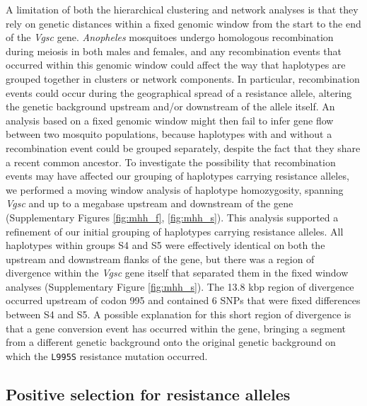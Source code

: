 \documentclass[a4paper,11pt,abstracton,hidelinks]{scrartcl}
\begin{document}
%
A limitation of both the hierarchical clustering and network analyses is that they rely on genetic distances within a fixed genomic window from the start to the end of the \textit{Vgsc} gene.
%
\textit{Anopheles} mosquitoes undergo homologous recombination during meiosis in both males and females, and any recombination events that occurred within this genomic window could affect the way that haplotypes are grouped together in clusters or network components.
%
In particular, recombination events could occur during the geographical spread of a resistance allele, altering the genetic background upstream and/or downstream of the allele itself.
%
An analysis based on a fixed genomic window might then fail to infer gene flow between two mosquito populations, because haplotypes with and without a recombination event could be grouped separately, despite the fact that they share a recent common ancestor.
%
To investigate the possibility that recombination events may have affected our grouping of haplotypes carrying resistance alleles, we performed a moving window analysis of haplotype homozygosity, spanning \textit{Vgsc} and up to a megabase upstream and downstream of the gene (Supplementary Figures \ref{fig:mhh_f}, \ref{fig:mhh_s}).
%
This analysis supported a refinement of our initial grouping of haplotypes carrying resistance alleles.
%
All haplotypes within groups S4 and S5 were effectively identical on both the upstream and downstream flanks of the gene, but there was a region of divergence within the \textit{Vgsc} gene itself that separated them in the fixed window analyses (Supplementary Figure \ref{fig:mhh_s}).
%
The 13.8 kbp region of divergence occurred upstream of codon 995 and contained 6 SNPs that were fixed differences between S4 and S5.
%
A possible explanation for this short region of divergence is that a gene conversion event has occurred within the gene, bringing a segment from a different genetic background onto the original genetic background on which the \texttt{L995S} resistance mutation occurred.
%


\subsection*{Positive selection for resistance alleles}

%
\end{document}
